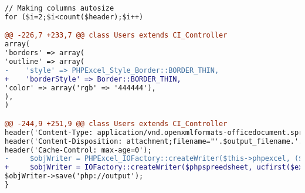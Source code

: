 \begin{lstlisting}[language=diff, basicstyle=\ttfamily, frame=single,
columns=fullflexible, keepspaces=true, breaklines=true]
// Making columns autosize
for ($i=2;$i<count($header);$i++)

@@ -226,7 +233,7 @@ class Users extends CI_Controller
array(
'borders' => array(
'outline' => array(
-    'style' => PHPExcel_Style_Border::BORDER_THIN,
+    'borderStyle' => Border::BORDER_THIN,
'color' => array('rgb' => '444444'),
),
)

@@ -244,9 +251,9 @@ class Users extends CI_Controller
header('Content-Type: application/vnd.openxmlformats-officedocument.spreadsheetml.sheet');
header('Content-Disposition: attachment;filename="'.$output_filename.'.'.$ext.'"');
header('Cache-Control: max-age=0');
-     $objWriter = PHPExcel_IOFactory::createWriter($this->phpexcel, ($ext==='xlsx'?'Excel2007':'Excel5'));
+     $objWriter = IOFactory::createWriter($phpspreedsheet, ucfirst($ext));
$objWriter->save('php://output');
}
\end{lstlisting}